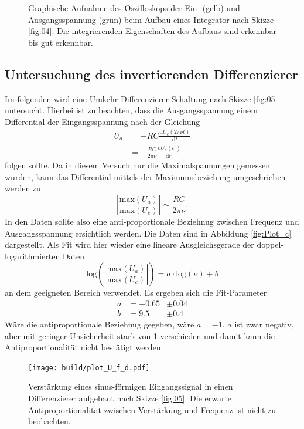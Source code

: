 \begin{figure}
\begin{subfigure}{0.35\textwidth}
  \end{subfigure}
  \caption{Graphische Aufnahme des Oszilloskops der Ein- (gelb) und Ausgangsspannung (grün) beim Aufbau eines Integrator nach Skizze \ref{fig:04}. Die integrierenden Eigenschaften des Aufbaus sind erkennbar bis gut erkennbar.}
  \label{fig:Osz_c}
\end{figure}
\FloatBarrier
\subsection{Untersuchung des invertierenden Differenzierer}
Im folgenden wird eine Umkehr-Differenzierer-Schaltung nach Skizze \ref{fig:05} untersucht. Hierbei ist zu beachten, dass die Ausgangsspannung einem Differential der Eingangsspannung nach der Gleichung
\begin{align}
  U_a &= -RC\frac{\text{d}U_e(2\pi \nu t)}{\text{d}t}\\
      &= -\frac{RC}{2\pi\nu} \frac{\text{d}U_e(t')}{\text{d}t'}
\end{align}
folgen sollte. Da in diesem Versuch nur die Maximalspannungen gemessen wurden, kann das Differential mittels der Maximumsbeziehung umgeschrieben werden zu
\begin{equation}
  \left|\frac{\text{max}\left(U_a\right)}{\text{max}\left(U_e\right)}\right| \sim \frac{RC}{2\pi\nu}.
\end{equation}
In den Daten sollte also eine anti-proportionale Beziehnug zwischen Frequenz und Ausgangsspannung ersichtlich werden. Die Daten sind in Abbildung \ref{fig:Plot_c} dargestellt. Als Fit wird hier wieder eine lineare Ausgleichsgerade der doppel-logarithmierten Daten
\begin{equation}
  \text{log}\left(\left|\frac{\text{max}\left(U_a\right)}{\text{max}\left(U_e\right)}\right|\right) = a\cdot\text{log}\left(\nu \right)+b
\end{equation}
an dem geeigneten Bereich verwendet. Es ergeben sich die Fit-Parameter
\begin{align}
  a &= -0.65 &\pm 0.04\\
  b &= 9.5   &\pm 0.4
\end{align}
Wäre die antiproportionale Beziehnug gegeben, wäre $a=-1$. $a$ ist zwar negativ, aber mit geringer Unsicherheit stark von 1 verschieden und damit kann die Antiproportionalität nicht bestätigt werden.
\FloatBarrier
\begin{figure}
  \centering
  \texttt{[image: build/plot\_U\_f\_d.pdf]}
  \caption{Verstärkung eines sinus-förmigen Eingangssignal in einen Differenzierer aufgebaut nach Skizze \ref{fig:05}. Die erwarte Antiproportionalität zwischen Verstärkung und Frequenz ist nicht zu beobachten.}
  \label{fig:Plot_d}
\end{figure}
